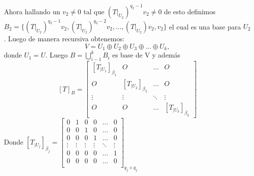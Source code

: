\documentclass[12pt,a4paper]{article}
\begin{document}
\begin{multicols}{2}
Ahora hallando un $v_{2}\neq0$ tal que $ (T|_{U_{2}})^{q_{2}-1}v_{2}\neq 0$  de esto definimos \\
$B_{2}=\{(T|_{U_{2}})^{q_{2}-1}v_{2}, (T|_{U_{2}})^{q_{2}-2}v_{2}, ..., (T|_{U_{2}})v_{2},v_{2} \}$ el cual es una base para $U_{2}$. Luego de manera recursiva obtenemos: \\
$$V=U_{1}\oplus U_{2}\oplus U_{3}\oplus ... \oplus U_{k},$$ donde $U_{1}=U$. Luego $B=\displaystyle\bigcup\limits_{i-1}^{k}B_{i} $ es base de V y además \\
$$\left [T\right]_{B}=\begin{bmatrix}
	\left[T_{|U_{1}}\right]_{\beta_{1}}	&	O	&	\ldots	&	O\\
	O	&	\left[T_{|U_{2}}\right]_{\beta_{2}}	&	\ldots	&	O\\
	\vdots	&	\vdots	& \ddots	& \vdots\\
	O	&	O	&	\ldots	&	\left[T_{|U_{k}}\right]_{\beta_{k}}
\end{bmatrix}$$
 Donde 	$\left[T_{|U_{j}}\right]_{\beta_{j}}=\begin{bmatrix}
		0	&	1	&	0	&	0	&	\ldots	&	0\\
		0	&	0	&	1	&	0	&	\ldots	&	0\\
		0	&	0	&	0	&	1	&	\ldots	&	0\\
		\vdots	&	\vdots	&	\vdots	&	\vdots	&	\ddots	&	\vdots\\
		0	&	0	&	0	&	0	&	\ldots	&	1\\
		0	&	0	&	0	&	0	&	\ldots	&	0\\
	\end{bmatrix}_{q_{j}\times q_{j}}$

\vspace{0.7cm}




\end{multicols}
\end{document}
